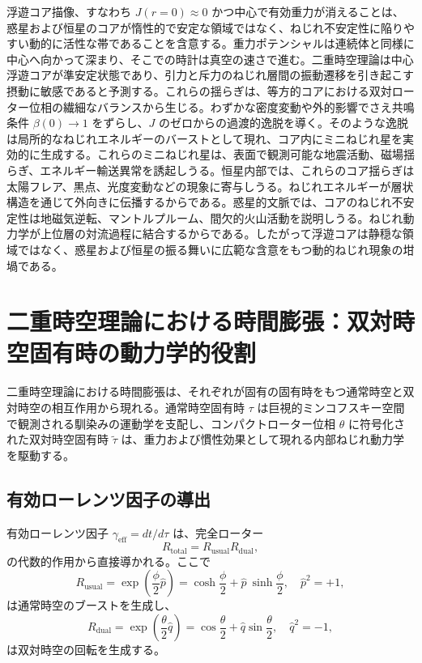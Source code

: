 \documentclass[a4paper]{article}
\begin{document}
浮遊コア描像、すなわち $J(r=0) \approx 0$ かつ中心で有効重力が消えることは、惑星および恒星のコアが惰性的で安定な領域ではなく、ねじれ不安定性に陥りやすい動的に活性な帯であることを含意する。重力ポテンシャルは連続体と同様に中心へ向かって深まり、そこでの時計は真空の速さで進む。二重時空理論は中心浮遊コアが準安定状態であり、引力と斥力のねじれ層間の振動遷移を引き起こす摂動に敏感であると予測する。これらの揺らぎは、等方的コアにおける双対ローター位相の繊細なバランスから生じる。わずかな密度変動や外的影響でさえ共鳴条件 $\beta(0) \to 1$ をずらし、$J$ のゼロからの過渡的逸脱を導く。そのような逸脱は局所的なねじれエネルギーのバーストとして現れ、コア内にミニねじれ星を実効的に生成する。これらのミニねじれ星は、表面で観測可能な地震活動、磁場揺らぎ、エネルギー輸送異常を誘起しうる。恒星内部では、これらのコア揺らぎは太陽フレア、黒点、光度変動などの現象に寄与しうる。ねじれエネルギーが層状構造を通じて外向きに伝播するからである。惑星的文脈では、コアのねじれ不安定性は地磁気逆転、マントルプルーム、間欠的火山活動を説明しうる。ねじれ動力学が上位層の対流過程に結合するからである。したがって浮遊コアは静穏な領域ではなく、惑星および恒星の振る舞いに広範な含意をもつ動的ねじれ現象の坩堝である。

\section{二重時空理論における時間膨張：双対時空固有時の動力学的役割}
\label{sec:timedilation}

二重時空理論における時間膨張は、それぞれが固有の固有時をもつ通常時空と双対時空の相互作用から現れる。通常時空固有時 $\tau$ は巨視的ミンコフスキー空間で観測される馴染みの運動学を支配し、コンパクトローター位相 $\theta$ に符号化された双対時空固有時 $\tilde{\tau}$ は、重力および慣性効果として現れる内部ねじれ動力学を駆動する。

\subsection{有効ローレンツ因子の導出}

有効ローレンツ因子 $\gamma_\text{eff} = dt/d\tau$ は、完全ローター
\[
R_\text{total} = R_\text{usual} R_\text{dual},
\]
の代数的作用から直接導かれる。ここで
\[
R_\text{usual} = \exp\!\left(\frac{\phi}{2} \hat{p}\right) = \cosh\frac{\phi}{2} + \hat{p}\: \sinh\frac{\phi}{2}, \quad \hat{p}^2 = +1,
\]
は通常時空のブーストを生成し、
\[
R_\text{dual} = \exp\!\left(\frac{\theta}{2} \hat{q}\right) = \cos\frac{\theta}{2} + \hat{q} \sin\frac{\theta}{2}, \quad \hat{q}^2 = -1,
\]
は双対時空の回転を生成する。
\end{document}
